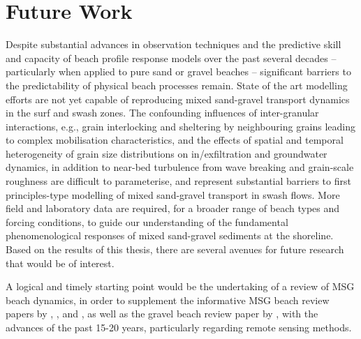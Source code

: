 


\section{Future Work}\label{section:FutureWork}

Despite substantial advances in observation techniques and the predictive skill and capacity of beach profile response models over the past several decades -- particularly when applied to pure sand or gravel beaches -- significant barriers to the predictability of physical beach processes remain. State of the art modelling efforts are not yet capable of reproducing mixed sand-gravel transport dynamics in the surf and swash zones. The confounding influences of inter-granular interactions, e.g., grain interlocking and sheltering by neighbouring grains leading to complex mobilisation characteristics, and the effects of spatial and temporal heterogeneity of grain size distributions on in/exfiltration and groundwater dynamics, in addition to near-bed turbulence from wave breaking and grain-scale roughness are difficult to parameterise, and represent substantial barriers to first principles-type modelling of mixed sand-gravel transport in swash flows. More field and laboratory data are required, for a broader range of beach types and forcing conditions, to guide our understanding of the fundamental phenomenological responses of mixed sand-gravel sediments at the shoreline. Based on the results of this thesis, there are several avenues for future research that would be of interest.

A logical and timely starting point would be the undertaking of a review of MSG beach dynamics, in order to supplement the informative MSG beach review papers by \citet{Kirk1980}, \citet{Mason_Coates2001}, and \citet{Pontee_etal2004}, as well as the gravel beach review paper by \citet{Buscombe_Masselink2006}, with the advances of the past 15-20 years, particularly regarding remote sensing methods.

